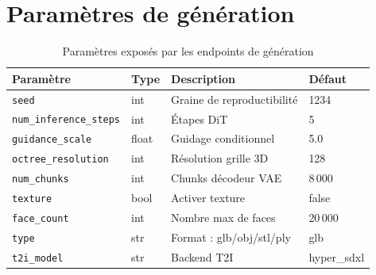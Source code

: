 \documentclass[12pt,a4paper,oneside]{report}
\newcommand{\theadrow}{\rowcolor{tekupblue!12}}
\begin{document}
\chapter{Paramètres de génération}
\label{ann:params}
\begin{table}[H]
\centering
\caption{Paramètres exposés par les endpoints de génération}
\begin{tabularx}{\linewidth}{@{}llXl@{}}
\toprule
\theadrow
\textbf{Paramètre} & \textbf{Type} & \textbf{Description} & \textbf{Défaut} \\\midrule
\texttt{seed}                  & int   & Graine de reproductibilité & 1234 \\
\texttt{num\_inference\_steps} & int   & Étapes DiT                 & 5 \\
\texttt{guidance\_scale}       & float & Guidage conditionnel       & 5.0 \\
\texttt{octree\_resolution}    & int   & Résolution grille 3D       & 128 \\
\texttt{num\_chunks}           & int   & Chunks décodeur VAE        & 8\,000 \\
\texttt{texture}               & bool  & Activer texture            & false \\
\texttt{face\_count}           & int   & Nombre max de faces        & 20\,000 \\
\texttt{type}                  & str   & Format : glb/obj/stl/ply   & glb \\
\texttt{t2i\_model}            & str   & Backend T2I                & hyper\_sdxl \\
\bottomrule
\end{tabularx}
\end{table}
\end{document}
